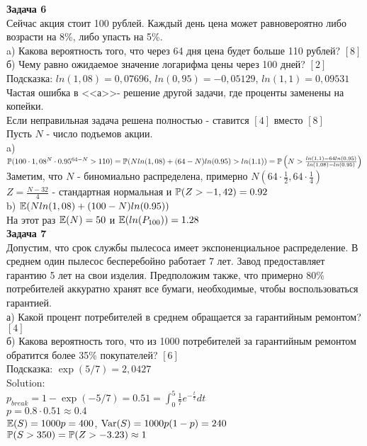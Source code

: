 \documentclass[pdftex,12pt,a4paper]{article}
\begin{document}
\textbf{Задача 6} \\ %
Сейчас акция стоит 100 рублей. Каждый день цена может равновероятно либо возрасти на 8\%, либо упасть на 5\%. \\
a) Какова вероятность того, что через 64 дня цена будет больше 110 рублей? $[8]$ \\
б) Чему равно ожидаемое значение логарифма цены через 100 дней? $[2]$ \\
Подсказка: $ln(1,08)=0,07696$, $ln(0,95)=-0,05129$, $ln(1,1)=0,09531$ \\
Частая ошибка в <<а>>- решение другой задачи, где проценты заменены на копейки. \\
Если неправильная задача решена полностью - ставится $[4]$ вместо $[8]$ \\
Пусть $N$ - число подъемов акции. \\
a) $\P(100\cdot 1,08^N\cdot 0.95^{64-N}>110)=\\
\P(Nln(1,08)+(64-N)ln(0.95)>ln(1.1))=\\
\P\left(N>\frac{ln(1,1)-64ln(0,95)}{ln(1,08)-ln(0.95)}\right)$\\
Заметим, что $N$ - биномиально распределена, примерно $N(64\cdot\frac{1}{2},64\cdot\frac{1}{4})$\\
$Z=\frac{N-32}{4}$ - стандартная нормальная и $\P(Z>-1,42)=0.92$ \\
b) $\E(Nln(1,08)+(100-N)ln(0.95))$ \\
На этот раз $\E(N)=50$ и $\E(ln(P_{100}))=1.28$ \\



\textbf{Задача 7} \\ 
Допустим, что срок службы пылесоса имеет экспоненциальное распределение. В среднем один пылесос бесперебойно работает 7 лет. Завод предоставляет гарантию 5 лет на свои изделия. Предположим также, что примерно 80\% потребителей аккуратно хранят все бумаги, необходимые, чтобы воспользоваться гарантией. \\
а) Какой процент потребителей в среднем обращается за гарантийным ремонтом? $[4]$ \\
б) Какова вероятность того, что из 1000 потребителей за гарантийным ремонтом обратится более 35\% покупателей? $[6]$ \\
Подсказка: $\exp(5/7)=2,0427$ \\
Solution: \\
$p_{break}=1-\exp(-5/7)=0.51=\int_{0}^{5}\frac{1}{7}e^{-\frac{t}{7}}dt$ \\
$p=0.8\cdot 0.51\approx 0.4$ \\
$\E(S)=1000p=400$, $\Var(S)=1000p(1-p)=240$ \\
$\P(S>350)=\P(Z>-3.23)\approx 1$ \\
\end{document}
